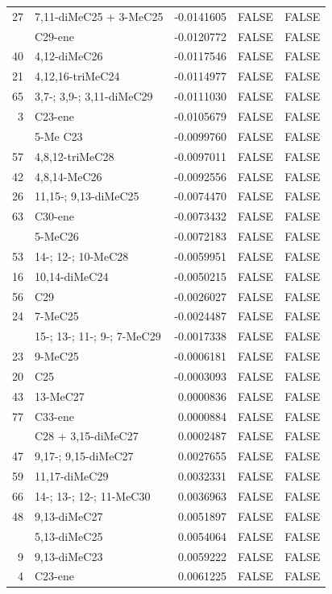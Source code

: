 \documentclass[
]{article}
\begin{document}
\begin{longtable}[t]{rlrll}
27 & 7,11-diMeC25 + 3-MeC25 & -0.0141605 & FALSE & FALSE\\
\addlinespace
55 & C29-ene & -0.0120772 & FALSE & FALSE\\
40 & 4,12-diMeC26 & -0.0117546 & FALSE & FALSE\\
21 & 4,12,16-triMeC24 & -0.0114977 & FALSE & FALSE\\
65 & 3,7-; 3,9-; 3,11-diMeC29 & -0.0111030 & FALSE & FALSE\\
3 & C23-ene & -0.0105679 & FALSE & FALSE\\
\addlinespace
8 & 5-Me C23 & -0.0099760 & FALSE & FALSE\\
57 & 4,8,12-triMeC28 & -0.0097011 & FALSE & FALSE\\
42 & 4,8,14-MeC26 & -0.0092556 & FALSE & FALSE\\
26 & 11,15-; 9,13-diMeC25 & -0.0074470 & FALSE & FALSE\\
63 & C30-ene & -0.0073432 & FALSE & FALSE\\
\addlinespace
34 & 5-MeC26 & -0.0072183 & FALSE & FALSE\\
53 & 14-; 12-; 10-MeC28 & -0.0059951 & FALSE & FALSE\\
16 & 10,14-diMeC24 & -0.0050215 & FALSE & FALSE\\
56 & C29 & -0.0026027 & FALSE & FALSE\\
24 & 7-MeC25 & -0.0024487 & FALSE & FALSE\\
\addlinespace
58 & 15-; 13-; 11-; 9-; 7-MeC29 & -0.0017338 & FALSE & FALSE\\
23 & 9-MeC25 & -0.0006181 & FALSE & FALSE\\
20 & C25 & -0.0003093 & FALSE & FALSE\\
43 & 13-MeC27 & 0.0000836 & FALSE & FALSE\\
77 & C33-ene & 0.0000884 & FALSE & FALSE\\
\addlinespace
51 & C28 + 3,15-diMeC27 & 0.0002487 & FALSE & FALSE\\
47 & 9,17-; 9,15-diMeC27 & 0.0027655 & FALSE & FALSE\\
59 & 11,17-diMeC29 & 0.0032331 & FALSE & FALSE\\
66 & 14-; 13-; 12-; 11-MeC30 & 0.0036963 & FALSE & FALSE\\
48 & 9,13-diMeC27 & 0.0051897 & FALSE & FALSE\\
\addlinespace
28 & 5,13-diMeC25 & 0.0054064 & FALSE & FALSE\\
9 & 9,13-diMeC23 & 0.0059222 & FALSE & FALSE\\
4 & C23-ene & 0.0061225 & FALSE & FALSE\\

\end{longtable}
\end{document}
